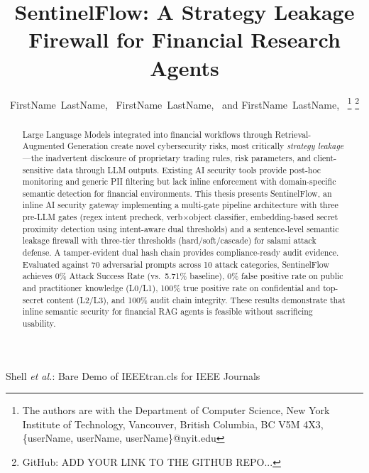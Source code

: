 \documentclass[journal,12pt,onecolumn,draftclsnofoot]{IEEEtran}
\begin{document}

\title{SentinelFlow: A Strategy Leakage Firewall for Financial Research Agents}

\author{FirstName~LastName,~
        FirstName~LastName,~
        and FirstName~LastName,~
\thanks{The authors are with the Department of Computer Science, 
New York Institute of Technology, Vancouver,
British Columbia, BC V5M 4X3, \{userName, userName, userName\}@nyit.edu} 
%
\thanks{GitHub: ADD YOUR LINK TO THE GITHUB REPO...}
}

{Shell \MakeLowercase{\textit{et al.}}: Bare Demo of IEEEtran.cls for IEEE Journals}
\maketitle

\tableofcontents%
\clearpage

\begin{abstract}
Large Language Models integrated into financial workflows through Retrieval-Augmented Generation create novel cybersecurity risks, most critically \textit{strategy leakage}---the inadvertent disclosure of proprietary trading rules, risk parameters, and client-sensitive data through LLM outputs. Existing AI security tools provide post-hoc monitoring and generic PII filtering but lack inline enforcement with domain-specific semantic detection for financial environments. This thesis presents SentinelFlow, an inline AI security gateway implementing a multi-gate pipeline architecture with three pre-LLM gates (regex intent precheck, verb$\times$object classifier, embedding-based secret proximity detection using intent-aware dual thresholds) and a sentence-level semantic leakage firewall with three-tier thresholds (hard/soft/cascade) for salami attack defense. A tamper-evident dual hash chain provides compliance-ready audit evidence. Evaluated against 70 adversarial prompts across 10 attack categories, SentinelFlow achieves 0\% Attack Success Rate (vs.\ 5.71\% baseline), 0\% false positive rate on public and practitioner knowledge (L0/L1), 100\% true positive rate on confidential and top-secret content (L2/L3), and 100\% audit chain integrity. These results demonstrate that inline semantic security for financial RAG agents is feasible without sacrificing usability.
\end{abstract}
\end{document}
